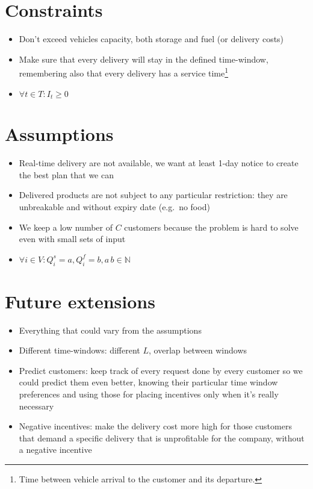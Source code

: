 \documentclass[10pt, letterpaper]{article}
\begin{document}
\section{Constraints}
\begin{itemize}
	\item 
		Don't exceed vehicles capacity, both storage and fuel (or delivery
		costs)

	\item 
		Make sure that every delivery will stay in the defined time-window,
		remembering also that every delivery has a service time\footnote{Time 
		between vehicle arrival to the customer and its departure.}

	\item
		\( \forall t \in T : I_{t} \geq 0 \)
\end{itemize}

\section{Assumptions}
\begin{itemize}
	\item 
		Real-time delivery are not available, we want at least 1-day notice
		to create the best plan that we can

	\item 
		Delivered products are not subject to any particular restriction:
		they are unbreakable and without expiry date (e.g.\ no food)


	\item 
		We keep a low number of \(C\) customers because the problem is hard
		to solve even with small sets of input

	\item
		\( \forall i\in V:Q_{i}^{s}=a,Q_{i}^{f}=b,a\,b\in\mathbb{{N}} \)
\end{itemize}

\section{Future extensions}
\begin{itemize}
	\item
		Everything that could vary from the assumptions

	\item
		Different time-windows: different \(L\), overlap between windows

	\item 
		Predict customers: keep track of every request done by every customer 
		so we could predict them even better, knowing their particular 
		time window preferences and using those for placing incentives only 
		when it's really necessary

	\item 
		Negative incentives: make the delivery cost more high for those 
		customers that demand a specific delivery that is unprofitable for 
		the company, without a negative incentive
\end{itemize}
\end{document}
